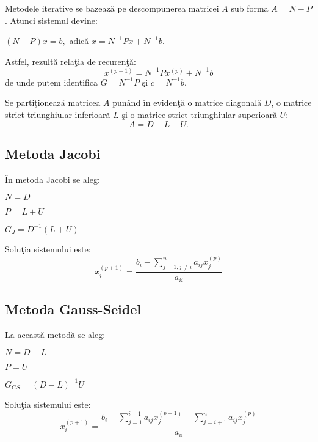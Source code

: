 \documentclass{exam}
\begin{document}
\par Metodele iterative se bazeaz\u{a} pe descompunerea matricei $A$ sub forma $A = N - P$. Atunci sistemul devine:

$(N - P)x = b, $ adică $x = {N}^{-1}Px + {N}^{-1}b.$

Astfel, rezult\u{a} rela\c{t}ia de recuren\c{t}\u{a}:
$${x}^{(p+1)} = {N}^{-1}P{x}^{(p)} + {N}^{-1}b$$
de unde putem identifica $G = {N}^{-1}P$ \c{s}i $c = {N}^{-1}b$.

\par Se parti\c{t}ioneaz\u{a} matricea $A$ pun\^{a}nd \^{i}n eviden\c{t}\u{a} o matrice diagonal\u{a} $D$, o matrice strict triunghiular inferioar\u{a} $L$ \c{s}i o matrice strict triunghiular superioar\u{a} $U$:
$$A = D - L - U.$$

\subsection{Metoda Jacobi}
\par \^{I}n metoda Jacobi se aleg:

$N = D$

$P = L + U$

${G}_{J} = {D}^{-1}(L + U)$

\par Solu\c{t}ia sistemului este:
$${x}_{i}^{(p+1)} = \frac{{b}_{i} - \sum_{j = 1, j \neq i}^{n}{a}_{ij}{x}_{j}^{(p)}}{{a}_{ii}}$$


\subsection{Metoda Gauss-Seidel}
\par La aceast\u{a} metod\u{a} se aleg:

$N = D - L$

$P = U$

${G}_{GS} = {(D - L)}^{-1}U$

Solu\c{t}ia sistemului este:
$${x}_{i}^{(p+1)} = \frac{{b}_{i} - \sum_{j = 1}^{i-1}{a}_{ij}{x}_{j}^{(p+1)} - \sum_{j = i + 1}^{n}{a}_{ij}{x}_{j}^{(p)}}{{a}_{ii}}$$

\end{document}

